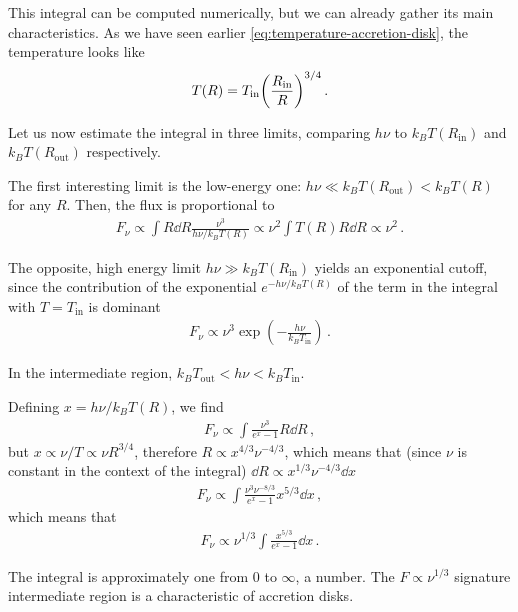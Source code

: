 \documentclass[main.tex]{subfiles}
\begin{document}
This integral can be computed numerically, but we can already gather its main characteristics. 
As we have seen earlier \eqref{eq:temperature-accretion-disk}, the temperature looks like 
%
\begin{align}
T(R) = T _{\text{in}} \qty( \frac{R _{\text{in}}}{R})^{3/4}
\,.
\end{align}

Let us now estimate the integral in three limits, comparing \(h \nu     \) to \(k_B T(R _{\text{in}})\) and \(k_B T (R _{\text{out}})\) respectively.

The first interesting limit is the low-energy one: \(h \nu \ll k_B T (R _{\text{out}}) < k_B T(R)\) for any \(R\).
Then, the flux is proportional to 
%
\begin{align}
F_\nu \propto \int R \dd{R} \frac{\nu^3}{h \nu / k_B T(R)} 
\propto \nu^2 \int T(R) R \dd{R} 
\propto \nu^2
\,.
\end{align}

The opposite, high energy limit \(h \nu \gg k_B T(R _{\text{in}})\) yields an exponential cutoff, since the contribution of the exponential \(e^{-h \nu / k_B T(R)}\) of the term in the integral with \(T = T _{\text{in}}\) is dominant 
%
\begin{align}
F_\nu \propto \nu^3 \exp(- \frac{h \nu }{k_B T _{\text{in}}})
\,.
\end{align}

In the intermediate region, \(k_B T _{\text{out}} < h \nu < k_B T _{\text{in}}\). 

Defining \(x = h \nu / k_B T(R)\), we find 
%
\begin{align}
F_\nu \propto \int \frac{\nu^3 }{e^{x} - 1} R \dd{R}
\,,
\end{align}
%
but \(x \propto \nu / T \propto \nu R^{3/4}\), therefore \(R \propto x^{4/3} \nu^{-4/3}\), which means that (since \(\nu \) is constant in the context of the integral) \(\dd{R} \propto x^{1/3} \nu^{-4/3} \dd{x}\) 
%
\begin{align}
F_\nu \propto \int \frac{\nu^3 \nu^{-8/3}}{e^{x}-1} x^{5/3} \dd{x} 
\,,
\end{align}
%
which means that 
%
\begin{align}
F_\nu \propto \nu^{1/3} \int \frac{x^{5/3}}{e^{x}-1} \dd{x}
\,.
\end{align}

The integral is approximately one from 0 to \(\infty \), a number. 
The \(F \propto \nu^{1/3}\) signature intermediate region is a characteristic of accretion disks.  
\end{document}
